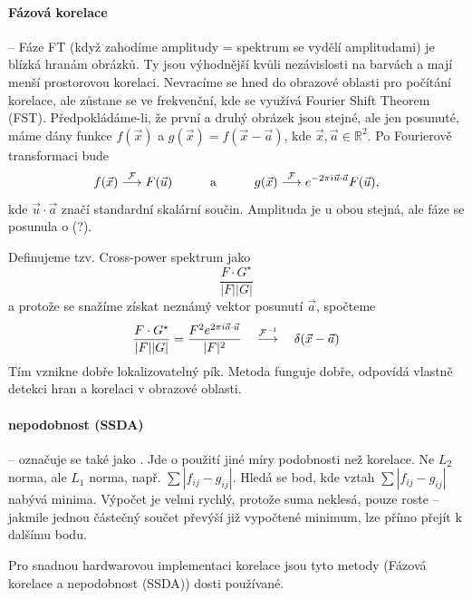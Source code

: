 \paragraph{Fázová korelace} -- Fáze FT (když zahodíme amplitudy = spektrum se vydělí amplitudami) je blízká hranám obrázků. Ty jsou výhodnější kvůli nezávislosti na barvách a mají menší prostorovou korelaci. Nevracíme se hned do obrazové oblasti pro počítání korelace, ale zůstane se ve frekvenční, kde se využívá Fourier Shift Theorem (FST). Předpokládáme-li, že první a druhý obrázek jsou stejné, ale jen posunuté, máme dány funkce $f(\vec{x})$ a $g(\vec{x})=f(\vec{x} - \vec{a})$, kde $ \vec{x}, \vec{a} \in \mathbb{R}^2 $. Po Fourierově
transformaci bude
\begin{equation}
f(\vec{x})\stackrel{\operatorname{\mathcal{F}}}{\longrightarrow} F(\vec{u})\qquad \quad \text{a} \qquad \quad g(\vec{x})\stackrel{\operatorname{\mathcal{F}}}{\longrightarrow} e^{-2\pi i \vec{u} \cdot \vec{a} }F(\vec{u}),
\end{equation}
kde $ \vec{u} \cdot \vec{a} $ značí standardní skalární součin. Amplituda je u obou stejná, ale fáze se posunula o (?).

Definujeme tzv. Cross-power spektrum jako
\begin{equation}
\frac{F \cdot G^\star}{|F||G|}
\end{equation}
a protože se snažíme získat neznámý vektor posunutí $\vec{a}$, spočteme
\begin{equation}
\frac{F\cdot G^\star}{|F||G|} = \frac{F^2e^{2\pi i \vec{a} \cdot \vec{u}}}{|F|^2} \quad \stackrel{\operatorname{\mathcal{F}^{\, --1}}}{\longrightarrow} \quad \delta(\vec{x}-\vec{a})
\end{equation}
Tím vznikne dobře lokalizovatelný pík. Metoda funguje dobře, odpovídá vlastně detekci hran a korelaci v obrazové oblasti.

\paragraph{nepodobnost (SSDA)} -- označuje se také jako . Jde o použití jiné míry podobnosti než korelace. Ne $ L_2 $ norma, ale $ L_1 $ norma, např. $\sum|f_{ij}-g_{ij}|$. Hledá se bod, kde vztah $\sum|f_{ij}-g_{ij}|$ nabývá minima. Výpočet je velmi rychlý, protože suma neklesá, pouze roste -- jakmile jednou částečný součet převýší již vypočtené minimum, lze přímo přejít k dalšímu bodu.

Pro snadnou hardwarovou implementaci korelace jsou tyto metody (Fázová korelace a nepodobnost (SSDA)) dosti používané.

